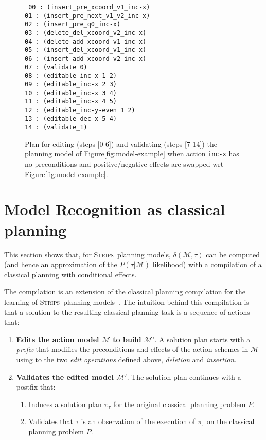 \documentclass[letterpaper]{article} %
\newcommand{\strips}{\textsc{Strips}}     %
\begin{document}
\begin{figure}
{\tt\tiny
00 : (insert\_pre\_xcoord\_v1\_inc-x)\\
01 : (insert\_pre\_next\_v1\_v2\_inc-x)\\
02 : (insert\_pre\_q0\_inc-x)\\
03 : (delete\_del\_xcoord\_v2\_inc-x)\\
04 : (delete\_add\_xcoord\_v1\_inc-x)\\
05 : (insert\_del\_xcoord\_v1\_inc-x)\\
06 : (insert\_add\_xcoord\_v2\_inc-x)\\
07 : (validate\_0)\\
08 : (editable\_inc-x 1 2)\\
09 : (editable\_inc-x 2 3)\\
10 : (editable\_inc-x 3 4)\\
11 : (editable\_inc-x 4 5)\\
12 : (editable\_inc-y-even 1 2)\\
13 : (editable\_dec-x 5 4)\\
14 : (validate\_1)
}
 \caption{\small Plan for editing (steps [0-6]) and validating (steps [7-14]) the planning model of Figure\ref{fig:model-example} when action {\tt\small inc-x} has no preconditions and positive/negative effects are swapped wrt Figure\ref{fig:model-example}.}
\label{fig:plan-pdistance}
\end{figure}



\section{Model Recognition as classical planning}
This section shows that, for \strips\ planning models, $\delta(\mathcal{M},\tau)$ can be computed (and hence an approximation of the $P(\tau|\mathcal{M})$ likelihood) with a compilation of a classical planning with conditional effects.

The compilation is an extension of the classical planning compilation for the learning of \strips\ planning models~\cite{aineto2018learning}. The intuition behind this compilation is that a solution to the resulting classical planning task is a sequence of actions that:
\begin{enumerate}
\item {\bf Edits the action model $\mathcal{M}$ to build $\mathcal{M}'$}. A solution plan starts with a {\em prefix} that modifies the preconditions and effects of the action schemes in $\mathcal{M}$ using to the two {\em edit operations} defined above, {\em deletion} and {\em insertion}. 
\item {\bf Validates the edited model $\mathcal{M}'$}. The solution plan continues with a postfix that:
\begin{enumerate}
\item Induces a solution plan $\pi_\tau$ for the original classical planning problem $P$.
\item Validates that $\tau$ is an observation of the execution of $\pi_\tau$ on the classical planning problem $P$.
\end{enumerate}
\end{enumerate}
\end{document}
